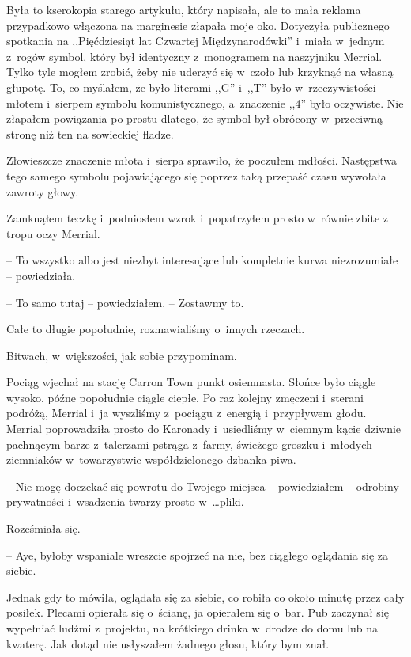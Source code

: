 \documentclass[oneside,polish,11pt,sfheadings]{mwbk}
\begin{document}
Była to kserokopia starego artykułu, który napisała, ale to mała reklama
przypadkowo włączona na marginesie złapała moje oko. Dotyczyła
publicznego spotkania na ,,Pięćdziesiąt lat Czwartej Międzynarodówki'' i~miała w~jednym z~rogów symbol, który był identyczny z~monogramem na
naszyjniku Merrial. Tylko tyle mogłem zrobić, żeby nie uderzyć się w~czoło lub krzyknąć na własną głupotę. To, co myślałem, że było literami
,,G'' i~,,T'' było w~rzeczywistości młotem i~sierpem symbolu
komunistycznego, a~znaczenie ,,4'' było oczywiste. Nie złapałem
powiązania po prostu dlatego, że symbol był obrócony w~przeciwną stronę
niż ten na sowieckiej fladze.

Złowieszcze znaczenie młota i~sierpa sprawiło, że poczułem mdłości.
Następstwa tego samego symbolu pojawiającego się poprzez taką przepaść
czasu wywołała zawroty głowy.

Zamknąłem teczkę i~podniosłem wzrok i~popatrzyłem prosto w~równie zbite
z tropu oczy Merrial.

-- To wszystko albo jest niezbyt interesujące lub kompletnie kurwa
niezrozumiałe -- powiedziała.

-- To samo tutaj -- powiedziałem. -- Zostawmy to.

Całe to długie popołudnie, rozmawialiśmy o~innych rzeczach.

Bitwach, w~większości, jak sobie przypominam.

Pociąg wjechał na stację Carron Town punkt osiemnasta. Słońce było
ciągle wysoko, późne popołudnie ciągle ciepłe. Po raz kolejny zmęczeni i~sterani podróżą, Merrial i~ja wyszliśmy z~pociągu z~energią i~przypływem
głodu. Merrial poprowadziła prosto do Karonady i~usiedliśmy w~ciemnym
kącie dziwnie pachnącym barze z~talerzami pstrąga z~farmy, świeżego
groszku i~młodych ziemniaków w~towarzystwie współdzielonego dzbanka
piwa.

-- Nie mogę doczekać się powrotu do Twojego miejsca -- powiedziałem -- odrobiny prywatności i~wsadzenia twarzy prosto w~\ldots pliki.

Roześmiała się. 

-- Aye, byłoby wspaniale wreszcie spojrzeć na nie, bez
ciągłego oglądania się za siebie.

Jednak gdy to mówiła, oglądała się za siebie, co robiła co około minutę
przez cały posiłek. Plecami opierała się o~ścianę, ja opierałem się o~bar. Pub zaczynał się wypełniać ludźmi z~projektu, na krótkiego drinka w~drodze do domu lub na kwaterę. Jak dotąd nie usłyszałem żadnego głosu,
który bym znał.
\end{document}
